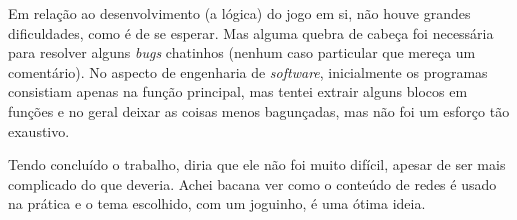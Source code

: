 \documentclass[12pt]{article}
\begin{document}
Em relação ao desenvolvimento (a lógica) do jogo em si, não houve grandes dificuldades, como é de se esperar. Mas alguma quebra de cabeça foi necessária para resolver alguns \textit{bugs} chatinhos (nenhum caso particular que mereça um comentário). No aspecto de engenharia de \textit{software}, inicialmente os programas consistiam apenas na função principal, mas tentei extrair alguns blocos em funções e no geral deixar as coisas menos bagunçadas, mas não foi um esforço tão exaustivo.

Tendo concluído o trabalho, diria que ele não foi muito difícil, apesar de ser mais complicado do que deveria. Achei bacana ver como o conteúdo de redes é usado na prática e o tema escolhido, com um joguinho, é uma ótima ideia.
\end{document}
